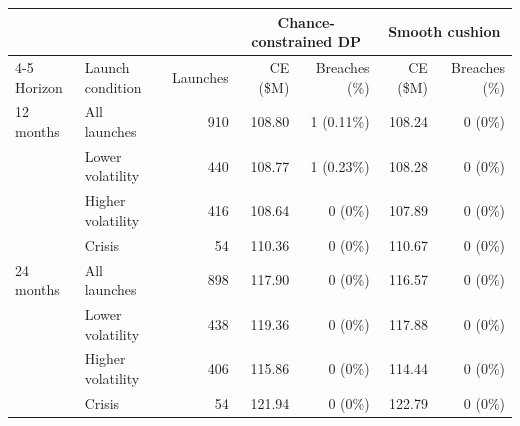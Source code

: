 \begin{tabular}{@{}llrrrrr@{}}
\hline
& & & \multicolumn{2}{c}{Chance-constrained DP} & \multicolumn{2}{c}{Smooth cushion} \\
\cline{4-5}\cline{6-7}
Horizon & Launch condition & Launches & CE (\$M) & Breaches (\%) & CE (\$M) & Breaches (\%) \\
\hline
12 months & All launches & 910 & 108.80 & 1 (0.11\%) & 108.24 & 0 (0\%) \\
 & Lower volatility & 440 & 108.77 & 1 (0.23\%) & 108.28 & 0 (0\%) \\
 & Higher volatility & 416 & 108.64 & 0 (0\%) & 107.89 & 0 (0\%) \\
 & Crisis & 54 & 110.36 & 0 (0\%) & 110.67 & 0 (0\%) \\
\hline
24 months & All launches & 898 & 117.90 & 0 (0\%) & 116.57 & 0 (0\%) \\
 & Lower volatility & 438 & 119.36 & 0 (0\%) & 117.88 & 0 (0\%) \\
 & Higher volatility & 406 & 115.86 & 0 (0\%) & 114.44 & 0 (0\%) \\
 & Crisis & 54 & 121.94 & 0 (0\%) & 122.79 & 0 (0\%) \\
\hline
\end{tabular}
